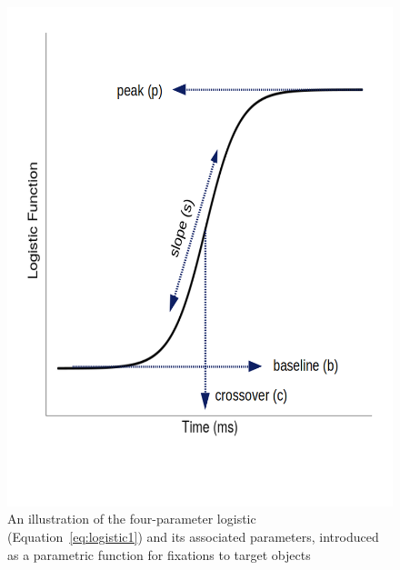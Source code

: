 \documentclass{article}
\begin{document}
\begin{figure}[H]
\centering
\includegraphics[scale=0.4]{logistic_label.png}
\caption{An illustration of the four-parameter logistic (Equation~\ref{eq:logistic1}) and its associated parameters, introduced as a parametric function for fixations to target objects}
\label{fig:logistic_definition}
\end{figure}
\end{document}
